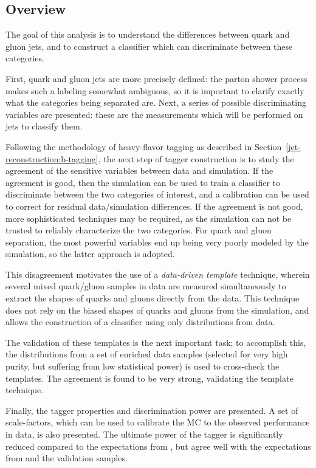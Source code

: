 \subsection{Overview}

The goal of this analysis is to understand the differences between quark and gluon jets, and to construct a classifier which can discriminate between these categories.

First, quark and gluon jets are more precisely defined: the parton shower process makes such a labeling somewhat ambiguous, so it is important to clarify exactly what the categories being separated are. Next, a series of possible discriminating variables are presented: these are the measurements which will be performed on jets to classify them.

Following the methodology of heavy-flavor tagging as described in Section~\ref{jet-reconstruction:b-tagging}, the next step of tagger construction is to study the agreement of the sensitive variables between data and simulation. If the agreement is good, then the simulation can be used to train a classifier to discriminate between the two categories of interest, and a calibration can be used to correct for residual data/simulation differences. If the agreement is not good, more sophisticated techniques may be required, as the simulation can not be trusted to reliably characterize the two categories. For quark and gluon separation, the most powerful variables end up being very poorly modeled by the simulation, so the latter approach is adopted.

This disagreement motivates the use of a \textit{data-driven template} technique, wherein several mixed quark/gluon samples in data are measured simultaneously to extract the shapes of quarks and gluons directly from the data. This technique does not rely on the biased shapes of quarks and gluons from the simulation, and allows the construction of a classifier using only distributions from data.

The validation of these templates is the next important task; to accomplish this, the distributions from a set of enriched data samples (selected for very high purity, but suffering from low statistical power) is used to cross-check the templates. The agreement is found to be very strong, validating the template technique.

Finally, the tagger properties and discrimination power are presented. A set of scale-factors, which can be used to calibrate the MC to the observed performance in data, is also presented. The ultimate power of the tagger is significantly reduced compared to the expectations from \Pythia, but agree well with the expectations from \Herwigpp and the validation samples.

